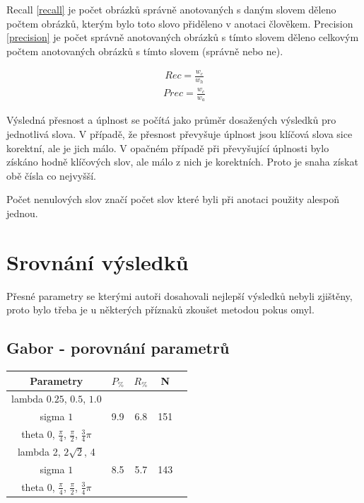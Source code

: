 \documentclass[czech,BP]{thesiskiv}
\begin{document}
\par Recall \eqref{recall} je počet obrázků správně anotovaných s daným slovem děleno počtem obrázků, kterým bylo toto slovo přiděleno v anotaci člověkem. Precision \eqref{precision} je počet správně anotovaných obrázků s tímto slovem děleno celkovým počtem anotovaných obrázků s tímto slovem (správně nebo ne). 

\begin{align}
   \label{recall} Rec = \frac{w_c}{w_h}
\end{align}
\begin{align}
   \label{precision} Prec = \frac{w_c}{w_a}
\end{align}

\par Výsledná přesnost a úplnost se počítá jako průměr dosažených výsledků pro jednotlivá slova. V případě, že přesnost převyšuje úplnost jsou klíčová slova sice korektní, ale je jich málo. V opačném případě při převyšující úplnosti bylo získáno hodně klíčových slov, ale málo z nich je korektních. Proto je snaha získat obě čísla co nejvyšší. 
\par Počet nenulových slov značí počet slov které byli při anotaci použity alespoň jednou. \cite{Result_A_A}



\section{Srovnání výsledků}
Přesné parametry se kterými autoři dosahovali nejlepší výsledků nebyli zjištěny, proto bylo třeba je u některých příznaků zkoušet metodou pokus omyl.


\subsection{Gabor - porovnání parametrů}
\begin{center}
\begin{tabular}{ |c|c|c|c|c| }
\hline
Parametry & $P_{\%}$ & $R_{\%}$ & N \\ \hline
 lambda $0.25$, $0.5$, $1.0$ & \multirow{3}{*}{9.9} & \multirow{3}{*}{6.8} & \multirow{3}{*}{151} \\
 sigma $1$ & & & \\
 theta $0$, $\frac{\pi}{4}$, $\frac{\pi}{2}$, $\frac{3}{4}\pi$ & & & \\ \hline
 lambda 2, $2\sqrt{2}$, 4 & \multirow{3}{*}{8.5} & \multirow{3}{*}{5.7} & \multirow{3}{*}{143} \\
 sigma $1$ & & & \\
 theta $0$, $\frac{\pi}{4}$, $\frac{\pi}{2}$, $\frac{3}{4}\pi$ & & & \\ 
\hline
\end{tabular}
\end{center}
\end{document}
